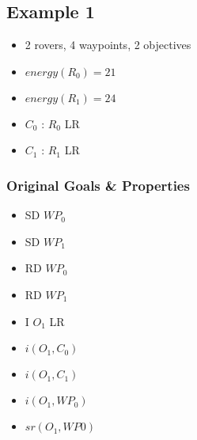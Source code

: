 \subsection*{Example 1}

\begin{itemize}
	\item 2 rovers, 4 waypoints, 2 objectives
	\item $energy(R_0) = 21$
	\item $energy(R_1) = 24$
	\item $C_0$ : $R_0$ LR
	\item $C_1$ : $R_1$ LR
\end{itemize}

\subsubsection*{Original Goals \& Properties}
\begin{minipage}[t]{0.45\textwidth}
	\begin{itemize}
		\item SD $WP_0$
		\item SD $WP_1$
		\item RD $WP_0$
		\item RD $WP_1$
		\item I $O_1$ LR
	\end{itemize}
\end{minipage}
\begin{minipage}[t]{0.45\textwidth}
	\begin{itemize}
		\item $i(O_1, C_0)$
		\item $i(O_1, C_1)$
		\item $i(O_1, WP_0)$
		\item $sr(O_1, WP0)$
	\end{itemize}
\end{minipage}

